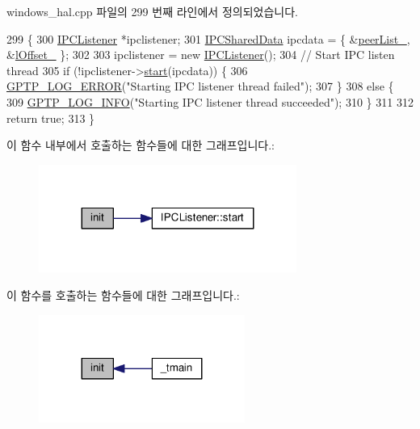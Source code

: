 windows\+\_\+hal.\+cpp 파일의 299 번째 라인에서 정의되었습니다.


\begin{DoxyCode}
299                                               \{
300     \hyperlink{class_i_p_c_listener}{IPCListener} *ipclistener;
301     \hyperlink{class_i_p_c_shared_data}{IPCSharedData} ipcdata = \{ &\hyperlink{class_windows_named_pipe_i_p_c_a14d4ab8d3c4d6d39463defa27105912d}{peerList\_}, &\hyperlink{class_windows_named_pipe_i_p_c_a5b017962912e5549312d6017c48345a8}{lOffset\_} \};
302 
303     ipclistener = \textcolor{keyword}{new} \hyperlink{class_i_p_c_listener}{IPCListener}();
304     \textcolor{comment}{// Start IPC listen thread}
305     \textcolor{keywordflow}{if} (!ipclistener->\hyperlink{class_i_p_c_listener_ad040984cedd269133c991f17be8808fc}{start}(ipcdata)) \{
306         \hyperlink{gptp__log_8hpp_afefbb1009717c128012bfeed94842987}{GPTP\_LOG\_ERROR}(\textcolor{stringliteral}{"Starting IPC listener thread failed"});
307     \}
308     \textcolor{keywordflow}{else} \{
309         \hyperlink{gptp__log_8hpp_ad59a6cd6d661bc3a4d13aaef2b0705a3}{GPTP\_LOG\_INFO}(\textcolor{stringliteral}{"Starting IPC listener thread succeeded"});
310     \}
311 
312     \textcolor{keywordflow}{return} \textcolor{keyword}{true};
313 \}
\end{DoxyCode}


이 함수 내부에서 호출하는 함수들에 대한 그래프입니다.\+:
\nopagebreak
\begin{figure}[H]
\begin{center}
\leavevmode
\includegraphics[width=239pt]{class_windows_named_pipe_i_p_c_a3f2ac4a024622c2fb268421b894ac12a_cgraph}
\end{center}
\end{figure}




이 함수를 호출하는 함수들에 대한 그래프입니다.\+:
\nopagebreak
\begin{figure}[H]
\begin{center}
\leavevmode
\includegraphics[width=191pt]{class_windows_named_pipe_i_p_c_a3f2ac4a024622c2fb268421b894ac12a_icgraph}
\end{center}
\end{figure}



